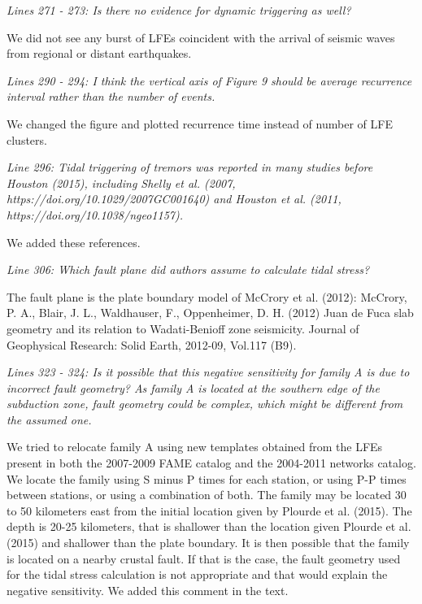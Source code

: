 \documentclass[letterpaper, 12pt]{article}
\begin{document}
\bigskip

\textit{Lines 271 - 273: Is there no evidence for dynamic triggering as well?}

\bigskip

We did not see any burst of LFEs coincident with the arrival of seismic waves from regional or distant earthquakes.

\bigskip

\textit{Lines 290 - 294: I think the vertical axis of Figure 9 should be average recurrence interval rather than the number of events.}

\bigskip

We changed the figure and plotted recurrence time instead of number of LFE clusters.

\bigskip

\textit{Line 296: Tidal triggering of tremors was reported in many studies before Houston (2015), including Shelly et al. (2007, https://doi.org/10.1029/2007GC001640) and Houston et al. (2011, https://doi.org/10.1038/ngeo1157).}

\bigskip

We added these references.

\bigskip

\textit{Line 306: Which fault plane did authors assume to calculate tidal stress?}

\bigskip

The fault plane is the plate boundary model of McCrory et al. (2012): McCrory, P. A., Blair, J. L., Waldhauser, F., Oppenheimer, D. H. (2012) Juan de Fuca slab geometry and its relation to Wadati-Benioff zone seismicity. 
Journal of Geophysical Research: Solid Earth, 2012-09, Vol.117 (B9).

\bigskip

\textit{Lines 323 - 324: Is it possible that this negative sensitivity for family A is due to incorrect fault geometry? As family A is located at the southern edge of the subduction zone, fault geometry could be complex, which might be different from the assumed one.}

\bigskip

We tried to relocate family A using new templates obtained from the LFEs present in both the 2007-2009 FAME catalog and the 2004-2011 networks catalog. We locate the family using S minus P times for each station, or using P-P times between stations, or using a combination of both. The family may be located 30 to 50 kilometers east from the initial location given by Plourde et al. (2015). The depth is 20-25 kilometers, that is shallower than the location given Plourde et al. (2015) and shallower than the plate boundary. It is then possible that the family is located on a nearby crustal fault. If that is the case, the fault geometry used for the tidal stress calculation is not appropriate and that would explain the negative sensitivity. We added this comment in the text.
\end{document}

